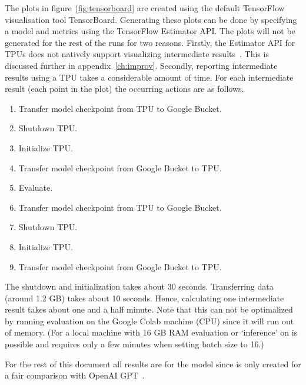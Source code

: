 The plots in figure~\ref{fig:tensorboard} are created using the default TensorFlow visualisation tool TensorBoard.
Generating these plots can be done by specifying a model and metrics using the TensorFlow Estimator API.
The plots will not be generated for the rest of the runs for two reasons.
Firstly, the Estimator API for TPUs does not natively support visualizing intermediate results~\citep{Lakshmanan2018tpu}.
This is discussed further in appendix~\ref{ch:improv}.
Secondly, reporting intermediate results using a TPU takes a considerable amount of time.
For each intermediate result (each point in the plot) the occurring actions are as follows.
\begin{enumerate}
    \item Transfer model checkpoint from TPU to Google Bucket.
    \item Shutdown TPU.
    \item Initialize TPU.
    \item Transfer model checkpoint from Google Bucket to TPU.
    \item Evaluate.
    \item Transfer model checkpoint from TPU to Google Bucket.
    \item Shutdown TPU.
    \item Initialize TPU.
    \item Transfer model checkpoint from Google Bucket to TPU.
\end{enumerate}
The shutdown and initialization takes about 30 seconds.
Transferring data (around 1.2 GB) takes about 10 seconds.
Hence, calculating one intermediate result takes about one and a half minute.
Note that this can not be optimalized by running evaluation on the Google Colab machine (CPU) since it will run out of memory.
(For a local machine with 16 GB RAM evaluation or `inference' on  is possible and requires only a few minutes when setting batch size to 16.)

For the rest of this document all results are for the  model since  is only created for a fair comparison with OpenAI GPT~\citep{devlin2018}.

